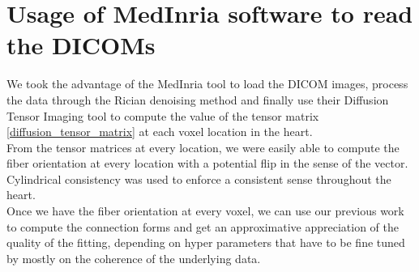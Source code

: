 \section{Usage of MedInria software to read the DICOMs}

We took the advantage of the MedInria tool to load the DICOM images, process the data through the Rician denoising method and finally use their Diffusion Tensor Imaging tool to compute the value of the tensor matrix \ref{diffusion_tensor_matrix} at each voxel location in the heart. \\
From the tensor matrices at every location, we were easily able to compute the fiber orientation at every location with a potential flip in the sense of the vector. Cylindrical consistency was used to enforce a consistent sense throughout the heart. \\
Once we have the fiber orientation at every voxel, we can use our previous work to compute the connection forms and get an approximative appreciation of the quality of the fitting, depending on hyper parameters that have to be fine tuned by mostly on the coherence of the underlying data.